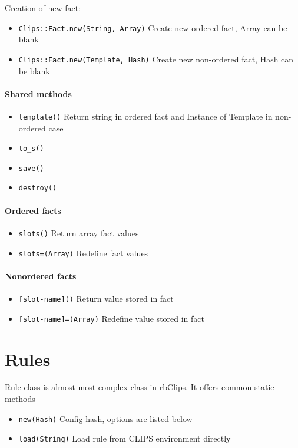 \documentclass[a4paper,10pt]{article}
\begin{document}
Creation of new fact:
\begin{itemize}
 \item \texttt{Clips::Fact.new(String, Array)} Create new ordered fact, Array can be blank
 \item \texttt{Clips::Fact.new(Template, Hash)} Create new non-ordered fact, Hash can be blank
\end{itemize}

\paragraph{Shared methods}
\begin{itemize}
 \item \texttt{template()} Return string in ordered fact and Instance of Template in non-ordered case
 \item \texttt{to\_s()}
 \item \texttt{save()}
 \item \texttt{destroy()}
\end{itemize}

\paragraph{Ordered facts}
\begin{itemize}
 \item \texttt{slots()} Return array fact values
 \item \texttt{slots=(Array)} Redefine fact values
\end{itemize}
\paragraph{Nonordered facts}
\begin{itemize}
 \item \texttt{[slot-name]()} Return value stored in fact
 \item \texttt{[slot-name]=(Array)} Redefine value stored in fact
\end{itemize}

\section{Rules}
Rule class is almost most complex class in rbClips. It offers common static methods
\begin{itemize}
 \item \texttt{new(Hash)} Config hash, options are listed below
 \item \texttt{load(String)} Load rule from CLIPS environment directly
\end{itemize}
\end{document}
